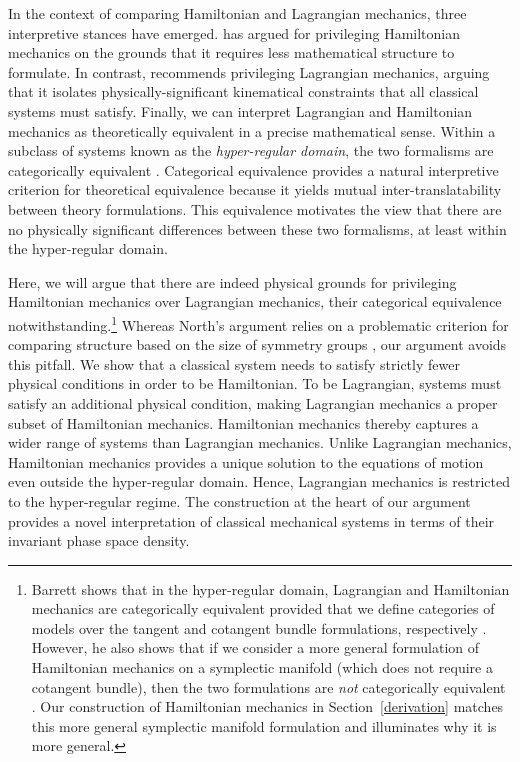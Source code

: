 \documentclass[12pt, twoside]{article}
\begin{document}
In the context of comparing Hamiltonian and Lagrangian mechanics, three interpretive stances have emerged. \textcites[]{North} has argued for privileging Hamiltonian mechanics on the grounds that it requires less mathematical structure to formulate. In contrast, \textcites[]{Curiel} recommends privileging Lagrangian mechanics, arguing that it isolates physically-significant kinematical constraints that all classical systems must satisfy. Finally, we can interpret Lagrangian and Hamiltonian mechanics as theoretically equivalent in a precise mathematical sense. Within a subclass of systems known as the \textit{hyper-regular domain}, the two formalisms are categorically equivalent \parencites[]{Teh}{Barrett2}. Categorical equivalence provides a natural interpretive criterion for theoretical equivalence because it yields mutual inter-translatability between theory formulations. This equivalence motivates the view that there are no physically significant differences between these two formalisms, at least within the hyper-regular domain. 

Here, we will argue that there are indeed physical grounds for privileging Hamiltonian mechanics over Lagrangian mechanics, their categorical equivalence notwithstanding.\footnote{Barrett shows that in the hyper-regular domain, Lagrangian and Hamiltonian mechanics are categorically equivalent provided that we define categories of models over the tangent and cotangent bundle formulations, respectively \parencites*[1181-82]{Barrett2}. However, he also shows that if we consider a more general formulation of Hamiltonian mechanics on a symplectic manifold (which does not require a cotangent bundle), then the two formulations are \textit{not} categorically equivalent \parencites*[1182-83]{Barrett2}. Our construction of Hamiltonian mechanics in Section~\ref{derivation} matches this more general symplectic manifold formulation and illuminates why it is more general.} Whereas North's argument relies on a problematic criterion for comparing structure based on the size of symmetry groups \parencites[]{Swanson}, our argument avoids this pitfall. We show that a classical system needs to satisfy strictly fewer physical conditions in order to be Hamiltonian. To be Lagrangian, systems must satisfy an additional physical condition, making Lagrangian mechanics a proper subset of Hamiltonian mechanics. Hamiltonian mechanics thereby captures a wider range of systems than Lagrangian mechanics. Unlike Lagrangian mechanics, Hamiltonian mechanics provides a unique solution to the equations of motion even outside the hyper-regular domain. Hence, Lagrangian mechanics is restricted to the hyper-regular regime. The construction at the heart of our argument provides a novel interpretation of classical mechanical systems in terms of their invariant phase space density. 
\end{document}
